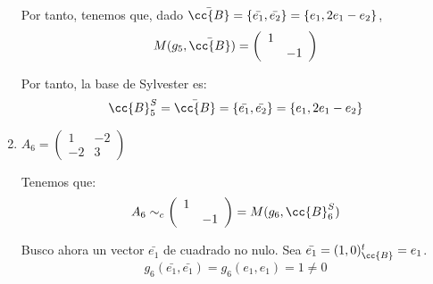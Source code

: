 \begin{ejercicio}
\begin{enumerate}
        Por tanto, tenemos que, dado $\bar{\cc{B}} = \{\bar{e_1},\bar{e_2}\} = \{e_1, 2e_1-e_2\}$,
        \begin{equation*}
            M(g_5, \bar{\cc{B}}) = \left(\begin{array}{cc}
            1 &  \\
             & -1
        \end{array} \right)
        \end{equation*}

        Por tanto, la base de Sylvester es:
        \begin{equation*}
            \cc{B}_5^S = \bar{\cc{B}} = \left\{\bar{e_1},\bar{e_2}\right\} = \left\{e_1, 2e_1-e_2\right\}
        \end{equation*}

        \item $A_6=\left(\begin{array}{cc}
            1 & -2 \\
            -2 & 3
        \end{array} \right)$
        
        Tenemos que:
        \begin{equation*}
            A_6 \sim_c \left(\begin{array}{cc}
                1 &  \\
                & -1
            \end{array} \right) = M(g_6, \cc{B}_{6}^S)
        \end{equation*}
        
        Busco ahora un vector $\bar{e_1}$ de cuadrado no nulo. Sea $\bar{e_1} = (1,0)^t_{\cc{B}} = e_1$.
        \begin{equation*}
            g_6(\bar{e_1}, \bar{e_1}) =
            g_6(e_1, e_1) = 1 \neq 0
        \end{equation*}


\end{enumerate}
\end{ejercicio}
